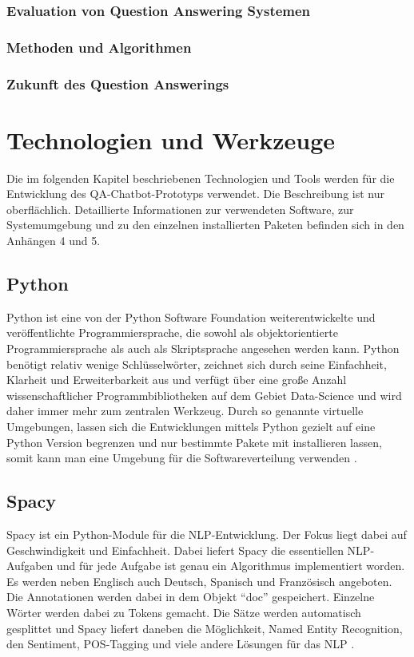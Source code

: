 \documentclass[
        ngerman,
        paper=a4,
        numbers=noendperiod,
]{scrreprt}
\begin{document}
\subsection{Evaluation von Question Answering Systemen}
\subsection{Methoden und Algorithmen}
\subsection{Zukunft des Question Answerings}



\chapter{Technologien und Werkzeuge}

Die im folgenden Kapitel beschriebenen Technologien und Tools werden für die Entwicklung des QA-Chatbot-Prototyps verwendet. Die Beschreibung ist nur oberflächlich. Detaillierte Informationen zur verwendeten Software, zur Systemumgebung und zu den einzelnen installierten Paketen befinden sich in den Anhängen 4 und 5. %
\section{Python}
Python ist eine von der Python Software Foundation weiterentwickelte und veröffentlichte Programmiersprache, die sowohl als objektorientierte Programmiersprache als auch als Skriptsprache angesehen werden kann. Python benötigt relativ wenige Schlüsselwörter, zeichnet sich durch seine Einfachheit, Klarheit und Erweiterbarkeit aus und verfügt über eine große Anzahl wissenschaftlicher Programmbibliotheken auf dem Gebiet Data-Science und wird daher immer mehr zum zentralen Werkzeug. 
Durch so genannte virtuelle Umgebungen, lassen sich die Entwicklungen mittels Python gezielt auf eine Python Version begrenzen und nur bestimmte Pakete mit installieren lassen, somit kann man eine Umgebung für die Softwareverteilung verwenden \citep[S. 2]{GrotzGrundkurs0.1.2d}.
\section{Spacy}
Spacy ist ein Python-Module für die NLP-Entwicklung. Der Fokus liegt dabei auf Geschwindigkeit und Einfachheit. Dabei liefert Spacy die essentiellen NLP-Aufgaben und für jede Aufgabe ist genau ein Algorithmus implementiert worden. Es werden neben Englisch auch Deutsch, Spanisch und Französisch angeboten. Die Annotationen werden dabei in dem Objekt \enquote{doc} gespeichert. Einzelne Wörter werden dabei zu Tokens gemacht. Die Sätze werden automatisch gesplittet und Spacy liefert daneben die Möglichkeit, Named Entity Recognition, den Sentiment, POS-Tagging und viele andere Lösungen für das NLP \citep{SpaCyDocumentation}.
\end{document}
